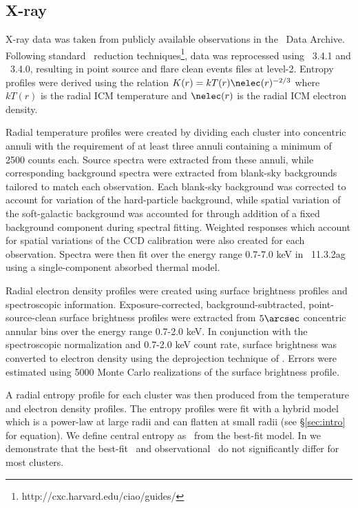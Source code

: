 \documentclass{emulateapj}
\begin{document}
\subsection{X-ray}
\label{sec:xray}

X-ray data was taken from publicly available observations in the
\Chandra\ Data Archive. Following standard \Ciao\ reduction
techniques\footnote{http://cxc.harvard.edu/ciao/guides/}, data was
reprocessed using \Ciao\ 3.4.1 and \Caldb\ 3.4.0, resulting in point
source and flare clean events files at level-2. Entropy profiles were
derived using the relation $K(r) = kT(r) \nelec(r)^{-2/3}$ where
$kT(r)$ is the radial ICM temperature and $\nelec(r)$ is the radial
ICM electron density.

Radial temperature profiles were created by dividing each cluster into
concentric annuli with the requirement of at least three annuli
containing a minimum of 2500 counts each. Source spectra were
extracted from these annuli, while corresponding background spectra
were extracted from blank-sky backgrounds tailored to match each
observation. Each blank-sky background was corrected to account for
variation of the hard-particle background, while spatial variation of
the soft-galactic background was accounted for through addition of a
fixed background component during spectral fitting. Weighted responses
which account for spatial variations of the CCD calibration were also
created for each observation. Spectra were then fit over the energy
range 0.7-7.0 keV in \xspec\ 11.3.2ag \citep{xspec} using a
single-component absorbed thermal model.

Radial electron density profiles were created using surface brightness
profiles and spectroscopic information. Exposure-corrected,
background-subtracted, point-source-clean surface brightness profiles
were extracted from $5\arcsec$ concentric annular bins over the energy
range 0.7-2.0 keV. In conjunction with the spectroscopic normalization
and 0.7-2.0 keV count rate, surface brightness was converted to
electron density using the deprojection technique of
\cite{kriss83}. Errors were estimated using 5000 Monte Carlo
realizations of the surface brightness profile.

A radial entropy profile for each cluster was then produced from the
temperature and electron density profiles. The entropy profiles were
fit with a hybrid model which is a power-law at large radii and can
flatten at small radii (see \S\ref{sec:intro} for equation). We define
central entropy as \kna\ from the best-fit model. In \cite{accept} we
demonstrate that the best-fit \kna\ and observational \kna\ do not
significantly differ for most clusters.
\end{document}
